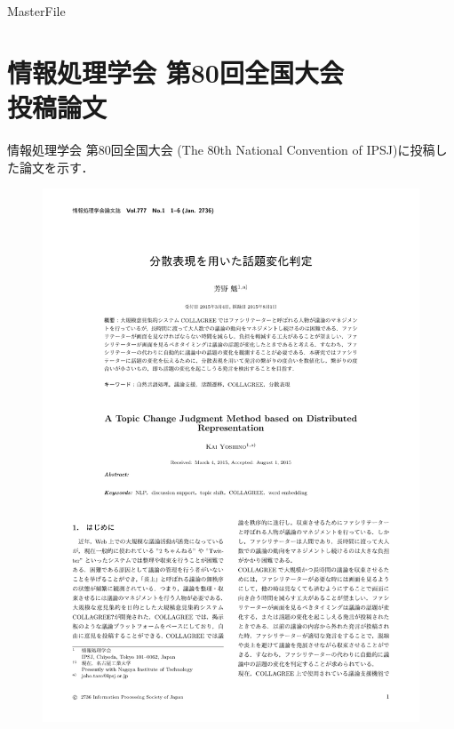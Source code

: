 \expandafter\ifx\csname MasterFile\endcsname\relax
\def\SubFile{hoge}


\fi
\cleardoublepage
\chapter[情報処理学会 第80回全国大会 投稿論文]{情報処理学会 第80回全国大会\\投稿論文}
情報処理学会 第80回全国大会 (The 80th National Convention of IPSJ)に投稿した論文を示す．
\begin{figure}
	\centering
	\includegraphics[width=\linewidth,page=1]{../C.IPSJ80/jsample-submit.pdf}
\end{figure}


